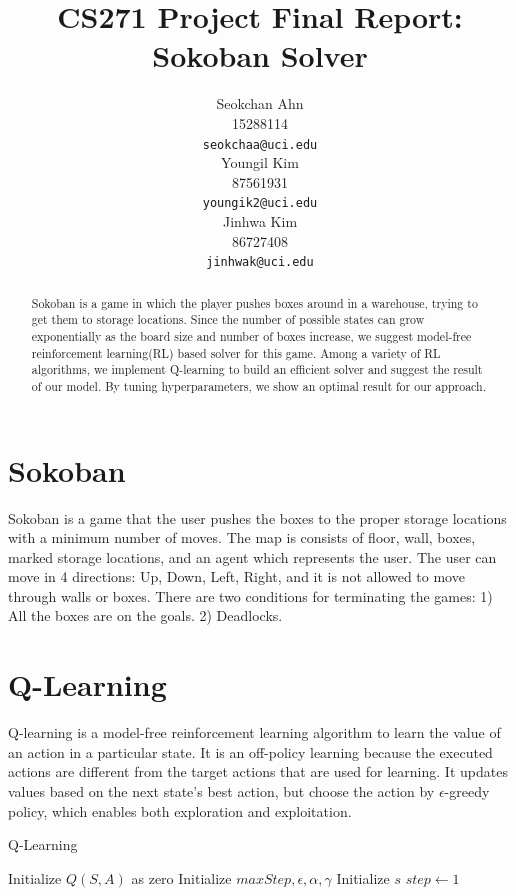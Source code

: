 \documentclass{article}
\title{CS271 Project Final Report: Sokoban Solver}
\author{
  Seokchan Ahn\\
  15288114 \\
  \texttt{seokchaa@uci.edu} \\
   \And
  Youngil Kim\\
  87561931\\
  \texttt{youngik2@uci.edu}\\
   \And
  Jinhwa Kim \\
  86727408 \\
  \texttt{jinhwak@uci.edu}
}
\begin{document}
\maketitle

\begin{abstract}
  Sokoban is a game in which the player pushes boxes around in a warehouse, trying to get them to storage locations. Since the number of possible states can grow exponentially as the board size and number of boxes increase, we suggest model-free reinforcement learning(RL) based solver for this game. Among a variety of RL algorithms, we implement Q-learning to build an efficient solver and suggest the result of our model. By tuning hyperparameters, we show an optimal result for our approach.
\end{abstract}

\section{Sokoban}
Sokoban is a game that the user pushes the boxes to the proper storage locations with a minimum number of moves. The map is consists of floor, wall, boxes, marked storage locations, and an agent which represents the user. The user can move in 4 directions: Up, Down, Left, Right, and it is not allowed to move through walls or boxes. There are two conditions for terminating the games: 1) All the boxes are on the goals. 2) Deadlocks.

\section{Q-Learning}

Q-learning is a model-free reinforcement learning algorithm to learn the value of an action in a particular state. It is an off-policy learning because the executed actions are different from the target actions that are used for learning. It updates values based on the next state's best action, but choose the action by $\epsilon$-greedy policy, which enables both exploration and exploitation.

\begin{algorithm}[H]
\caption{Q-Learning}\label{alg:one}
Initialize $Q(S, A)$ as zero\;
Initialize $maxStep, \epsilon, \alpha, \gamma$\;
Initialize $s$ 
$step \gets 1$\;

\end{algorithm}
\end{document}
